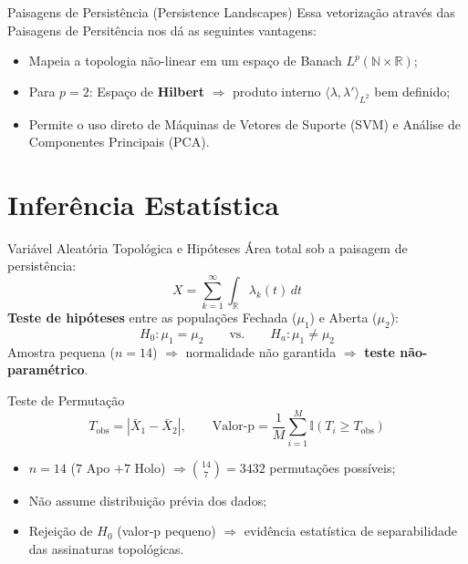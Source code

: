 \documentclass[aspectratio=169]{beamer}
\begin{document}
\begin{frame}{Paisagens de Persistência (Persistence Landscapes)}
    Essa vetorização através das Paisagens de Persitência nos dá as seguintes vantagens:
    \begin{itemize}
        \item Mapeia a topologia não-linear em um espaço de Banach $L^p(\mathbb{N} \times \mathbb{R})$;
        \item Para $p=2$: Espaço de \textbf{Hilbert} $\Rightarrow$ produto interno $\langle \lambda, \lambda'\rangle_{L^2}$ bem definido;
        \item Permite o uso direto de Máquinas de Vetores de Suporte (SVM) e Análise de Componentes Principais (PCA).
    \end{itemize}
\end{frame}

\section{Inferência Estatística}

\begin{frame}{Variável Aleatória Topológica e Hipóteses}
  Área total sob a paisagem de persistência:
  \[
    X = \sum_{k=1}^{\infty} \int_{\mathbb R} \lambda_k(t)\, dt
  \]
  \textbf{Teste de hipóteses} entre as populações Fechada ($\mu_1$) e Aberta ($\mu_2$):
  \[
    H_0: \mu_1 = \mu_2 \qquad \text{vs.} \qquad H_a: \mu_1 \neq \mu_2
  \]
  Amostra pequena ($n=14$) $\Rightarrow$ normalidade não garantida $\Rightarrow$ \textbf{teste não-paramétrico}.
\end{frame}

\begin{frame}{Teste de Permutação}
  \[
    T_{\mathrm{obs}} = |\bar X_1 - \bar X_2|, \qquad
    \text{Valor-p} = \frac{1}{M}\sum_{i=1}^{M} \mathbb{I}(T_i \geq T_{\mathrm{obs}})
  \]
  \begin{itemize}
    \item $n=14$ ($7$ Apo $+ 7$ Holo) $\Rightarrow \binom{14}{7} = 3432$ permutações possíveis;
    \item Não assume distribuição prévia dos dados;
    \item Rejeição de $H_0$ (valor-p pequeno) $\Rightarrow$ evidência estatística de separabilidade das assinaturas topológicas.
  \end{itemize}
\end{frame}
\end{document}
